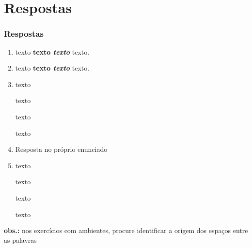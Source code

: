 \documentclass[handout,10pt]{beamer}
\begin{document}
\section{Respostas}
\begin{frame}[fragile,label=respostas]
	\frametitle{Respostas}
	\scriptsize
	
	\begin{enumerate}
	\item%
		\begin{LaTeXcode}
			texto \textbf{texto \textit{texto}} texto.
		\end{LaTeXcode}
		
	\item%
		\begin{LaTeXcode}
			texto {\bfseries texto \itshape texto} texto.
		\end{LaTeXcode}
		
	\item%
		\begin{LaTeXcode}
			texto \begin{bfseries}texto\begin{itshape}
			texto\end{itshape}\end{bfseries} texto
		\end{LaTeXcode}
		
	\item Resposta no próprio enunciado
	
	\item%
		\begin{LaTeXcode}
		{texto\begin{slshape}\begin{sffamily}
		texto\end{sffamily}\end{slshape}}
		\end{LaTeXcode}
		
		\begin{LaTeXcode}
		{texto\begin{slshape}\begin{scshape}
		texto\end{scshape}\end{slshape}}
		\end{LaTeXcode}
	\end{enumerate}
	
	\textbf{obs.:} nos exercícios com ambientes, procure identificar a origem dos espaços entre as palavras
	
\end{frame}
\end{document}

